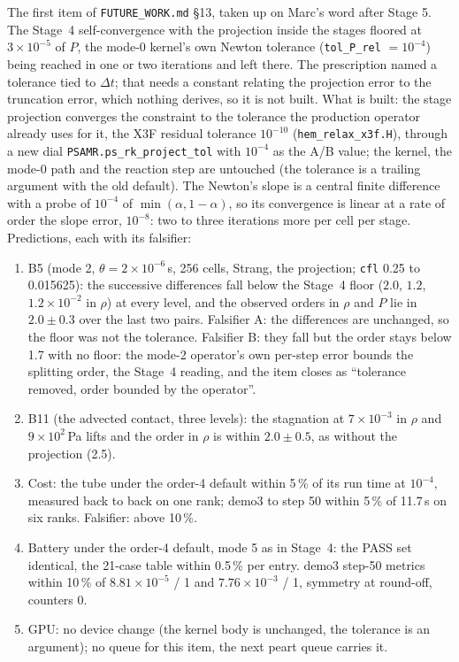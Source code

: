 \documentclass[11pt,a4paper]{article}
\newcommand{\code}[1]{\texttt{\small #1}}
\newcommand{\Dt}{\Delta t}
\begin{document}
The first item of \code{FUTURE\_WORK.md} \S13, taken up on Marc's word
after Stage 5.  The Stage~4 self-convergence with the projection inside
the stages floored at $3\times10^{-5}$ of $P$, the mode-0 kernel's own
Newton tolerance (\code{tol\_P\_rel} $=10^{-4}$) being reached in one
or two iterations and left there.  The prescription named a tolerance
tied to $\Dt$; that needs a constant relating the projection error to
the truncation error, which nothing derives, so it is not built.  What
is built: the stage projection converges the constraint to the
tolerance the production operator already uses for it, the X3F residual
tolerance $10^{-10}$ (\code{hem\_relax\_x3f.H}), through a new dial
\code{PSAMR.ps\_rk\_project\_tol} with $10^{-4}$ as the A/B value;
the kernel, the mode-0 path and the reaction step are untouched (the
tolerance is a trailing argument with the old default).  The Newton's
slope is a central finite difference with a probe of $10^{-4}$ of
$\min(\alpha, 1-\alpha)$, so its convergence is linear at a rate of
order the slope error, $10^{-8}$: two to three iterations more per cell
per stage.  Predictions, each with its falsifier:
\begin{enumerate}[nosep]
\item B5 (mode 2, $\theta = 2\times10^{-6}$\,s, 256 cells, Strang, the
      projection; \code{cfl} 0.25 to 0.015625): the successive
      differences fall below the Stage~4 floor ($2.0$, $1.2$,
      $1.2\times10^{-2}$ in $\rho$) at every level, and the observed
      orders in $\rho$ and $P$ lie in $2.0\pm0.3$ over the last two
      pairs.  Falsifier A: the differences are unchanged, so the floor
      was not the tolerance.  Falsifier B: they fall but the order stays
      below 1.7 with no floor: the mode-2 operator's own per-step error
      bounds the splitting order, the Stage~4 reading, and the item
      closes as ``tolerance removed, order bounded by the operator''.
\item B11 (the advected contact, three levels): the stagnation at
      $7\times10^{-3}$ in $\rho$ and $9\times10^{2}$\,Pa lifts and the
      order in $\rho$ is within $2.0\pm0.5$, as without the projection
      (2.5).
\item Cost: the tube under the order-4 default within 5\,\% of its
      run time at $10^{-4}$, measured back to back on one rank; demo3 to
      step 50 within 5\,\% of 11.7\,s on six ranks.  Falsifier: above
      10\,\%.
\item Battery under the order-4 default, mode 5 as in Stage~4: the
      PASS set identical, the 21-case table within 0.5\,\% per entry.
      demo3 step-50 metrics within 10\,\% of $8.81\times10^{-5}$ / 1
      and $7.76\times10^{-3}$ / 1, symmetry at round-off, counters 0.
\item GPU: no device change (the kernel body is unchanged, the
      tolerance is an argument); no queue for this item, the next peart
      queue carries it.
\end{enumerate}
\end{document}
